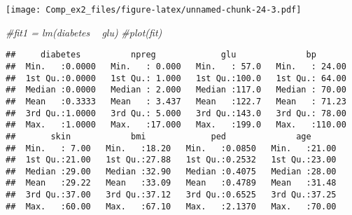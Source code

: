 \documentclass[]{article}
\newenvironment{Shaded}{\begin{snugshade}}{\end{snugshade}}
\newcommand{\CommentTok}[1]{\textcolor[rgb]{0.56,0.35,0.01}{\textit{#1}}}
\begin{document}
\texttt{[image: Comp\_ex2\_files/figure-latex/unnamed-chunk-24-3.pdf]}

\begin{Shaded}
\begin{Highlighting}[]
\CommentTok{#fit1 = lm(diabetes ~ glu)}
\CommentTok{#plot(fit)}
\end{Highlighting}
\end{Shaded}

\begin{verbatim}
##     diabetes          npreg             glu              bp        
##  Min.   :0.0000   Min.   : 0.000   Min.   : 57.0   Min.   : 24.00  
##  1st Qu.:0.0000   1st Qu.: 1.000   1st Qu.:100.0   1st Qu.: 64.00  
##  Median :0.0000   Median : 2.000   Median :117.0   Median : 70.00  
##  Mean   :0.3333   Mean   : 3.437   Mean   :122.7   Mean   : 71.23  
##  3rd Qu.:1.0000   3rd Qu.: 5.000   3rd Qu.:143.0   3rd Qu.: 78.00  
##  Max.   :1.0000   Max.   :17.000   Max.   :199.0   Max.   :110.00  
##       skin            bmi             ped              age       
##  Min.   : 7.00   Min.   :18.20   Min.   :0.0850   Min.   :21.00  
##  1st Qu.:21.00   1st Qu.:27.88   1st Qu.:0.2532   1st Qu.:23.00  
##  Median :29.00   Median :32.90   Median :0.4075   Median :28.00  
##  Mean   :29.22   Mean   :33.09   Mean   :0.4789   Mean   :31.48  
##  3rd Qu.:37.00   3rd Qu.:37.12   3rd Qu.:0.6525   3rd Qu.:37.25  
##  Max.   :60.00   Max.   :67.10   Max.   :2.1370   Max.   :70.00
\end{verbatim}
\end{document}
